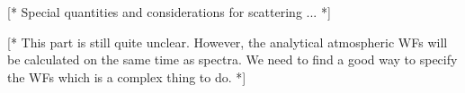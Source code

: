 [* Special quantities and considerations for scattering ... *]



\label{sec:fm_defs:wfs}

[* This part is still quite unclear. However, the analytical
atmospheric WFs will be calculated on the same time as spectra. We
need to find a good way to specify the WFs which is a complex thing to
do. *]


